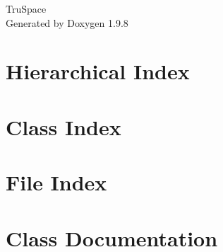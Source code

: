 \documentclass[twoside]{book}
\newcommand{\+}{\discretionary{\mbox{\scriptsize$\hookleftarrow$}}{}{}}
\newcommand{\clearemptydoublepage}{%
    \newpage{\pagestyle{empty}\cleardoublepage}%
  }
\begin{document}
  \raggedbottom
    \hypersetup{pageanchor=false,
                bookmarksnumbered=true,
                pdfencoding=unicode
               }
  \begin{titlepage}
  \vspace*{7cm}
  \begin{center}%
  {\Large Tru\+Space}\\
  \vspace*{1cm}
  {\large Generated by Doxygen 1.9.8}\\
  \end{center}
  \end{titlepage}
  \clearemptydoublepage
  \tableofcontents
  \clearemptydoublepage
  \hypersetup{pageanchor=true}

\chapter{Hierarchical Index}

\chapter{Class Index}

\chapter{File Index}

\chapter{Class Documentation}



























\end{document}
